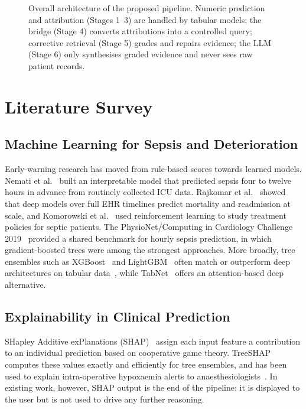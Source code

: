 \documentclass[conference]{IEEEtran}
\begin{document}
\begin{figure}[!t]
{}
\caption{Overall architecture of the proposed pipeline. Numeric prediction
and attribution (Stages 1--3) are handled by tabular models; the bridge
(Stage 4) converts attributions into a controlled query; corrective
retrieval (Stage 5) grades and repairs evidence; the LLM (Stage 6) only
synthesises graded evidence and never sees raw patient records.}
\label{fig:arch}
\end{figure}

\section{Literature Survey}

\subsection{Machine Learning for Sepsis and Deterioration}
Early-warning research has moved from rule-based scores towards learned
models. Nemati et al.~\cite{nemati2018aise} built an interpretable model
that predicted sepsis four to twelve hours in advance from routinely
collected ICU data. Rajkomar et al.~\cite{rajkomar2018ehr} showed that deep
models over full EHR timelines predict mortality and readmission at scale,
and Komorowski et al.~\cite{komorowski2018aiclinician} used reinforcement
learning to study treatment policies for septic patients. The
PhysioNet/Computing in Cardiology Challenge 2019~\cite{reyna2020physionet}
provided a shared benchmark for hourly sepsis prediction, in which
gradient-boosted trees were among the strongest approaches. More broadly,
tree ensembles such as XGBoost~\cite{chen2016xgboost} and
LightGBM~\cite{ke2017lightgbm} often match or outperform deep architectures
on tabular data~\cite{shwartz2022tabular}, while TabNet~\cite{arik2021tabnet}
offers an attention-based deep alternative.

\subsection{Explainability in Clinical Prediction}
SHapley Additive exPlanations (SHAP)~\cite{lundberg2017shap} assign each
input feature a contribution to an individual prediction based on
cooperative game theory. TreeSHAP~\cite{lundberg2020treeshap} computes
these values exactly and efficiently for tree ensembles, and has been used
to explain intra-operative hypoxaemia alerts to
anaesthesiologists~\cite{lundberg2018hypoxaemia}. In existing work,
however, SHAP output is the end of the pipeline: it is displayed to the
user but is not used to drive any further reasoning.
\end{document}
